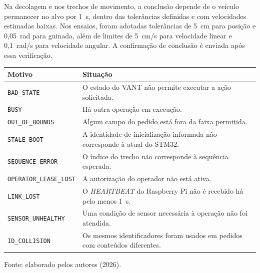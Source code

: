 Na decolagem e nos trechos de movimento, a conclusão depende de o veículo permanecer no alvo por 1~s, dentro das tolerâncias definidas e com velocidades estimadas baixas. Nos ensaios, foram adotadas tolerâncias de 5~cm para posição e 0,05~rad para guinada, além de limites de 5~cm/s para velocidade linear e 0,1~rad/s para velocidade angular. A confirmação de conclusão é enviada após essa verificação.


\begin{quadro}[H]
    \centering
    \caption{Principais motivos de recusa de um trecho.}
    \label{qua:dronelink_motivos}
    \small
    \renewcommand{\arraystretch}{1.25}
    \begin{tabular}{|>{\raggedright\arraybackslash}p{4.8cm}|>{\raggedright\arraybackslash}p{9cm}|}
        \hline
        \textbf{Motivo} & \textbf{Situação} \\
        \hline
        \texttt{BAD\_STATE} &
        O estado do VANT não permite executar a ação solicitada. \\
        \hline
        \texttt{BUSY} &
        Há outra operação em execução. \\
        \hline
        \texttt{OUT\_OF\_BOUNDS} &
        Algum campo do pedido está fora da faixa permitida. \\
        \hline
        \texttt{STALE\_BOOT} &
        A identidade de inicialização informada não corresponde à atual do STM32. \\
        \hline
        \texttt{SEQUENCE\_ERROR} &
        O índice do trecho não corresponde à sequência esperada. \\
        \hline
        \texttt{OPERATOR\_LEASE\_LOST} &
        A autorização do operador não está ativa. \\
        \hline
        \texttt{LINK\_LOST} &
        O \textit{HEARTBEAT} do Raspberry Pi não é recebido há pelo menos 1~s. \\
        \hline
        \texttt{SENSOR\_UNHEALTHY} &
        Uma condição de sensor necessária à operação não foi atendida. \\
        \hline
        \texttt{ID\_COLLISION} &
        Os mesmos identificadores foram usados em pedidos com conteúdos diferentes. \\
        \hline
    \end{tabular}
    \par\vspace{0.2cm}
    \footnotesize Fonte: elaborado pelos autores (2026).
\end{quadro}

